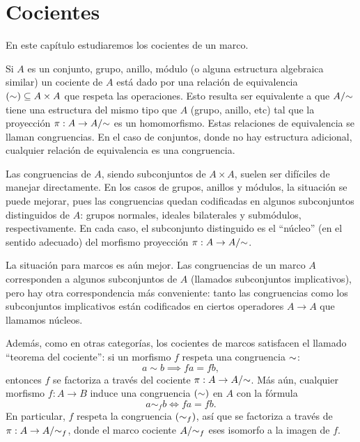 \chapter{Cocientes}
\label{ch:cocientes}

En este capítulo estudiaremos los cocientes de un marco.

Si $A$ es un conjunto, grupo, anillo, módulo (o alguna estructura
algebraica similar) un cociente de $A$ está dado por una relación de
equivalencia $({\sim})\subseteq A\times A$ que respeta las operaciones.
Esto resulta ser equivalente a que $A/{\sim}$ tiene una estructura del
mismo tipo que $A$ (grupo, anillo, etc) tal que la proyección
$\pi:A\to A/{\sim}$ es un homomorfismo.
Estas relaciones de
equivalencia se llaman congruencias. En el caso de conjuntos, donde no
hay estructura adicional, cualquier relación de equivalencia es una
congruencia.

Las congruencias de $A$, siendo subconjuntos de $A\times A$, suelen ser
difíciles de manejar directamente. En los casos de grupos, anillos y
módulos, la situación se puede mejorar, pues las congruencias quedan
codificadas en algunos subconjuntos distinguidos de $A$:
grupos normales, ideales bilaterales y submódulos, respectivamente.
En cada caso, el subconjunto distinguido es el ``núcleo'' (en el
sentido adecuado) del morfismo proyección $\pi:A\to A/{\sim}$.

La situación para marcos es aún mejor. Las congruencias de un marco
$A$ corresponden a algunos subconjuntos de $A$ (llamados subconjuntos
implicativos), pero hay otra correspondencia más conveniente:
tanto las congruencias como los subconjuntos implicativos están
codificados en ciertos operadores $A\to A$ que llamamos núcleos.

Además, como en otras categorías, los cocientes de marcos satisfacen
el llamado ``teorema del cociente'': si un morfismo $f$ respeta
una congruencia ${\sim}$:
\begin{equation}
  a\sim b \implies fa = fb,
\end{equation}
entonces $f$ se factoriza a través del cociente $\pi:A\to A/{\sim}$.
Más aún, cualquier morfismo $f:A\to B$ induce una congruencia
$({\sim})$ en $A$ con la fórmula
\begin{equation}
  a\sim_f b \iff fa = fb.
\end{equation}
En particular, $f$ respeta la congruencia $({\sim}_f)$, así que se
factoriza a través de $\pi:A\to A/{\sim}_f$, donde el marco cociente
$A/{\sim}_f$ eses isomorfo a la imagen de $f$.

